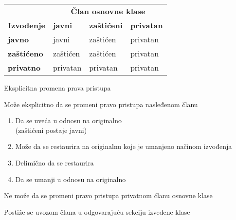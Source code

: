 \documentclass{article}
\newenvironment{xitemize}{%
    
    \itemize
    \larger
}{%
    \enditemize
}
\let\olditemize\itemize
\let\endolditemize\enditemize
\renewenvironment{itemize}{%
    \smaller
    \olditemize
}{%
    \endolditemize
}
\begin{document}
\begin{xitemize}
\begin{multicols}{2}
\begin{itemize}
\end{itemize}
\columnbreak
\end{multicols}
\begin{table}[h]
    \centering
    \begin{tabular}{|l|lll}
    \hline
    \multicolumn{1}{|c|}{}                                     & \multicolumn{3}{c|}{\textbf{Član osnovne klase}}                                                                       \\ \cline{2-4} 
    \multicolumn{1}{|c|}{\multirow{-2}{*}{\textbf{Izvođenje}}} & \multicolumn{1}{l|}{\textbf{javni}} & \multicolumn{1}{l|}{\textbf{zaštićeni}} & \multicolumn{1}{l|}{\textbf{privatan}} \\ \hline
    \textbf{javno}                                             & \cellcolor[HTML]{DAE8FC}javni       & \cellcolor[HTML]{DAE8FC}zaštićen        & \cellcolor[HTML]{DAE8FC}privatan       \\ \cline{1-1}
    \textbf{zaštićeno}                                         & \cellcolor[HTML]{DAE8FC}zaštićen    & \cellcolor[HTML]{DAE8FC}zaštićen        & \cellcolor[HTML]{DAE8FC}privatan       \\ \cline{1-1}
    \textbf{privatno}                                          & \cellcolor[HTML]{DAE8FC}privatan    & \cellcolor[HTML]{DAE8FC}privatan        & \cellcolor[HTML]{DAE8FC}privatan       \\ \cline{1-1}
    \end{tabular}
    \end{table}
\item Eksplicitna promena prava pristupa
\begin{itemize}
    \item Može eksplicitno da se promeni pravo pristupa nasleđenom članu
    \begin{enumerate}
        \item Da se uveća u odnosu na originalno\\
        (zaštićeni postaje javni)
        \item Može da se restaurira na originalnu koje je umanjeno načinom izvođenja
        \item Delimično da se restaurira
        \item Da se umanji u odnosu na originalno
    \end{enumerate}
    \item Ne može da se promeni pravo pristupa privatnom članu osnovne klase
    \item Postiže se uvozom člana u odgovarajuću sekciju izvedene klase\\

\end{itemize}
\end{xitemize}
\end{document}
